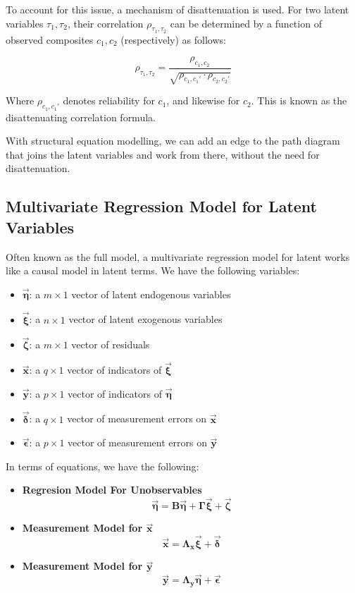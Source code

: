 \documentclass{article}
\begin{document}
\begin{multicols*}{2}
To account for this issue, a mechanism of disattenuation is used. For two latent variables $\tau_1,\tau_2$, their correlation $\rho_{\tau_1,\tau_2}$ can be determined by a function of observed composites $c_1, c_2$ (respectively) as follows:

\[\rho_{\tau_1,\tau_2} = \frac{\rho_{c_1, c_2}}{\sqrt{\rho_{c_1, c_1'} \cdot \rho_{c_2, c_2'}}}\]

Where $\rho_{c_1, c_1'}$ denotes reliability for $c_1$, and likewise for $c_2$. This is known as the disattenuating correlation formula.

With structural equation modelling, we can add an edge to the path diagram that joins the latent variables and work from there, without the need for disattenuation.

\subsection{Multivariate Regression Model for Latent Variables}

Often known as the full model, a multivariate regression model for latent works like a causal model in latent terms. We have the following variables: 

\begin{itemize}
    \item $\mathbf{\vec{\eta}}$: a $m \times 1$ vector of latent endogenous variables
    \item $\mathbf{\vec{\xi}}$: a $n \times 1$ vector of latent exogenous variables
    \item $\mathbf{\vec{\zeta}}$: a $m \times 1$ vector of residuals
    \item $\mathbf{\vec{x}}$: a $q \times 1$ vector of indicators of $\mathbf{\vec{\xi}}$
    \item $\mathbf{\vec{y}}$: a $p \times 1$ vector of indicators of $\mathbf{\vec{\eta}}$
    \item $\mathbf{\vec{\delta}}$: a $q \times 1$ vector of measurement errors on $\mathbf{\vec{x}}$
    \item $\mathbf{\vec{\epsilon}}$: a $p \times 1$ vector of measurement errors on $\mathbf{\vec{y}}$
\end{itemize}

In terms of equations, we have the following:

\begin{itemize}
    \item \textbf{Regresion Model For Unobservables}
    \[\mathbf{\vec{\eta}} = \mathbf{B}\mathbf{\vec{\eta}} + \mathbf{\Gamma}\mathbf{\vec{\xi}} + \mathbf{\vec{\zeta}}\]
    \item \textbf{Measurement Model for $\mathbf{\vec{x}}$}
    \[\mathbf{\vec{x}} = \mathbf{\Lambda_x}\mathbf{\vec{\xi}} + \mathbf{\vec{\delta}}\]
    \item \textbf{Measurement Model for $\mathbf{\vec{y}}$}
    \[\mathbf{\vec{y}} = \mathbf{\Lambda_y}\mathbf{\vec{\eta}} + \mathbf{\vec{\epsilon}}\]
\end{itemize}


\end{multicols*}
\end{document}
